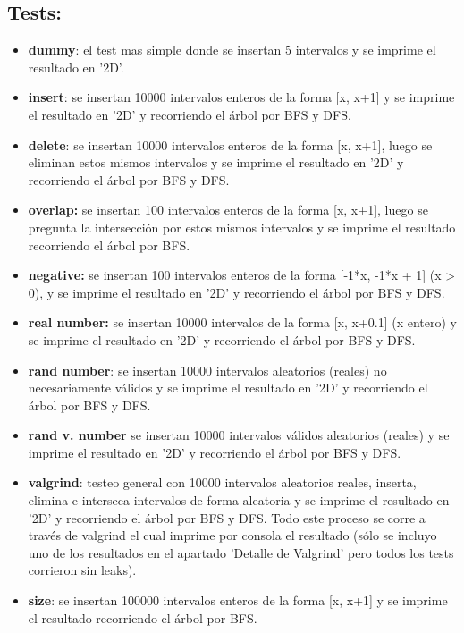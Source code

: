 \documentclass[a4paper, 12pt]{article}
\begin{document}
\subsection{Tests:}
\begin{itemize}
\item \textbf{dummy}: el test mas simple donde se insertan 5 intervalos y se imprime el resultado en '2D'.
\item \textbf{insert}: se insertan 10000 intervalos enteros de la forma [x, x+1] y se imprime el resultado en '2D' y recorriendo el árbol por BFS y DFS.
\item \textbf{delete}: se insertan 10000 intervalos enteros de la forma [x, x+1], luego se eliminan estos mismos intervalos y se imprime el resultado en '2D' y recorriendo el árbol por BFS y DFS.
\item \textbf{overlap:} se insertan 100 intervalos enteros de la forma [x, x+1], luego se pregunta la intersección por estos mismos intervalos y se imprime el resultado recorriendo el árbol por BFS.
\item \textbf{negative:} se insertan 100 intervalos enteros de la forma [-1*x, -1*x + 1] (x > 0),  y se imprime el resultado en '2D' y recorriendo el árbol por BFS y DFS.
\item \textbf{real number:}  se insertan 10000 intervalos de la forma [x, x+0.1] (x entero) y se imprime el resultado en '2D' y recorriendo el árbol por BFS y DFS.
\item \textbf{rand number}: se insertan 10000 intervalos aleatorios (reales) no necesariamente válidos y se imprime el resultado en '2D' y recorriendo el árbol por BFS y DFS.
\item \textbf{rand v. number} se insertan 10000 intervalos válidos aleatorios (reales) y se imprime el resultado en '2D' y recorriendo el árbol por BFS y DFS.
\item \textbf{valgrind}: testeo general con 10000 intervalos aleatorios reales, inserta, elimina e interseca intervalos de forma aleatoria  y se imprime el resultado en '2D' y recorriendo el árbol por BFS y DFS. Todo este proceso se corre a través de valgrind el cual imprime por consola el resultado (sólo se incluyo uno de los resultados en el apartado 'Detalle de Valgrind' pero todos los tests corrieron sin leaks).
\item \textbf{size}: se insertan 100000 intervalos enteros de la forma [x, x+1] y se imprime el resultado recorriendo el árbol por BFS.
\end{itemize}
\end{document}
